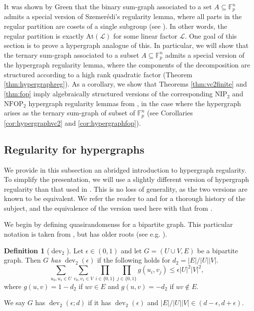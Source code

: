 \documentclass[12pt,oneside,british,a4wide]{amsart}
\numberwithin{equation}{section}
\theoremstyle{definition}
\newtheorem{definition}[theorem]{Definition}
\def\F{\mathbb{F}}
\def\NFOP{\mathrm{NFOP}}
\def\NIP{\mathrm{NIP}}
\def\e{\epsilon}
\newcommand{\calL}{\mathcal{L}}
\newcommand{\At}{{\mathrm{At}}}
\def\dev{\operatorname{dev}}
\begin{document}
It was shown by Green that the binary sum-graph associated to a set $A\subseteq \F_p^n$ admits a special version of Szemer\'{e}di's regularity lemma, where all parts in the regular partition are cosets of a single subgroup (see \cite[Section 9]{Green.2005}). In other words, the regular partition is exactly $\At(\calL)$ for some linear factor $\calL$.  One goal of this section is to prove a hypergraph analogue of this. In particular, we will show that the ternary sum-graph associated to a subset $A\subseteq \F_p^n$ admits a special version of the hypergraph regularity lemma, where the components of the decomposition are structured according to a high rank quadratic factor (Theorem \ref{thm:hypergraphreg}).  As a corollary, we show that Theorems \ref{thm:vc2finite} and \ref{thm:fop} imply algebraically structured versions of the corresponding $\NIP_2$ and $\NFOP_2$ hypergraph regularity lemmas from  \cite{Terry.2021b}, in the case where the hypergraph arises as the ternary sum-graph of subset of $\F_p^n$ (see Corollaries \ref{cor:hypergraphvc2} and \ref{cor:hypergraphfop}).  

\subsection{Regularity for  hypergraphs}
We provide in this subsection an abridged introduction to hypergraph regularity.   To simplify the presentation, we will use a slightly different version of hypergraph regularity than that used in \cite{Terry.2021b}.  This is no loss of generality, as the two versions are known to be equivalent. We refer the reader to \cite{Nagle.2013} and \cite{Nagle.2024} for a thorough history of the subject, and the equivalence of the version used here with that from \cite{Terry.2021b}. 

 

We begin by defining quasirandomenss for a  bipartite graph. This particular notation is taken from \cite{Nagle.2013}, but has older roots (see e.g. \cite{Chung.1990}). 

\begin{definition}[$\dev_2$]\label{def:dev2}
Let $\e\in (0,1)$ and let $G=(U\cup V,E)$ be a bipartite graph. Then \emph{$G$ has $\dev_2(\e)$} if the following holds for $d_2=|E|/|U||V|$.
$$
\sum_{u_0,u_1\in U}\sum_{v_0,v_1\in V} \prod_{i\in \{0,1\}}\prod_{j\in \{0,1\}}g(u_i,v_j)\leq \e |U|^2|V|^2,
$$
where $g(u,v)=1-d_2$ if $uv\in E$ and $g(u,v)=-d_2$ if $uv\notin E$.

We say $G$ has $\dev_2(\e; d)$ if it has $\dev_2(\e)$ and $|E|/|U||V|\in (d-\e, d+\e)$.
\end{definition}
\end{document}
